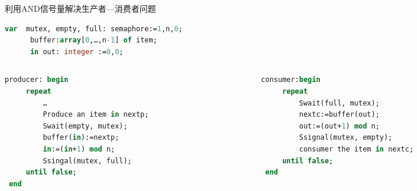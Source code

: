  \begin{frame}[fragile]{利用AND信号量解决生产者—消费者问题}
 \begin{lstlisting}[tabsize=8,keywordstyle=\color{red},basicstyle=\small, language=Pascal]
 var  mutex, empty, full: semaphore:=1,n,0;
      buffer:array[0,…,n-1] of item;
      in out: integer :=0,0;
 \end{lstlisting}

 \begin{columns}[onlytextwidth,T]
 \begin{column}{0.46 \textwidth}
 \begin{lstlisting}[tabsize=8,keywordstyle=\color{red},basicstyle=\small, language=Pascal, firstnumber=last]
 producer: begin
     repeat
         …
         Produce an item in nextp;
         Swait(empty, mutex);
         buffer(in):=nextp;
         in:=(in+1) mod n;
         Ssingal(mutex, full);
     until false;
 end
 \end{lstlisting}
 \end{column}
 \begin{column}{0.46 \textwidth}
 \begin{lstlisting}[tabsize=8,keywordstyle=\color{red},basicstyle=\small, language=Pascal, firstnumber=last]
 consumer:begin
     repeat
         Swait(full, mutex);
         nextc:=buffer(out);
         out:=(out+1) mod n;
         Ssignal(mutex, empty);
         consumer the item in nextc;
     until false;
 end
 \end{lstlisting}
 \end{column}
 \end{columns}
\end{frame}



